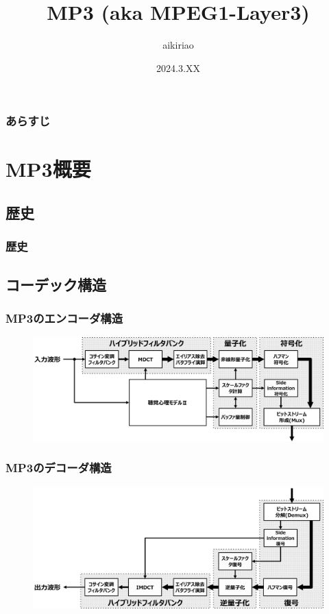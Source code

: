 \documentclass[14pt,xcolor=dvipsnames,table,dvipdfmx]{beamer}
\title{MP3 (aka MPEG1-Layer3)}
\author[aikiriao]{aikiriao}
\date{2024.3.XX}
\begin{document}
\maketitle

\begin{frame}[c]
    \frametitle{あらすじ}
    \tableofcontents
\end{frame}

\section{MP3概要}

\subsection{歴史}

\begin{frame}[c]
    \frametitle{歴史}
\end{frame}

\subsection{コーデック構造}

\begin{frame}[c]
    \frametitle{MP3のエンコーダ構造}
    \begin{figure}
        \includegraphics[width=115mm]{./figs/mp3_encoder_struct.png}
    \end{figure}
\end{frame}

\begin{frame}[c]
    \frametitle{MP3のデコーダ構造}
    \begin{figure}
        \includegraphics[width=115mm]{./figs/mp3_decoder_struct.png}
    \end{figure}
\end{frame}
\end{document}
